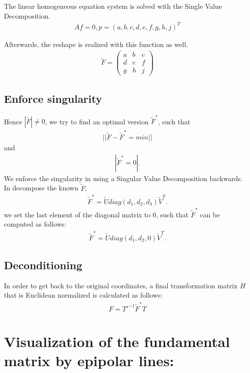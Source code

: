 \documentclass[a4paper,headings=small]{scrartcl}
\numberwithin{equation}{section} %
\numberwithin{figure}{section}   %
\begin{document}
  The linear homogeneous equation system is solved with the Single Value Decomposition.
  \begin{align}
  Af=0, p=(a,b,c,d,e,f,g,h,j)^T 
  \end{align}

  Afterwards, the reshape is realized with this function as well.
  \begin{align}
  \tilde{F}=
  \left( \begin{array}{cccc}
  a & b & c \\
  d & e & f \\ 
  g & h & j
  \end{array} \right)
  \end{align}

  \subsection{Enforce singularity}
Hence $|\tilde{F}|\neq 0$, we try  to find an optimal version $\tilde{F}^*$, such that
  \begin{align}
  ||\tilde{F}-\tilde{F}^*=min||
  \end{align}
and
  \begin{align}
  |\tilde{F}^*=0|.
  \end{align}
We enforce the singularity in using a Singular Value Decomposition backwards.
In decompose the known $\tilde{F}$,
  \begin{align}
  \tilde{F}^*=\tilde{U} diag(d_1,d_2,d_3)\tilde{V}^T.
  \end{align}  
we set the last element of the diagonal matrix to 0, such that $\tilde{F}^*$ can be computed
as follows:
  \begin{align}
  \tilde{F}^*=\tilde{U} diag(d_1,d_2,0)\tilde{V}^T.
  \end{align}
  \subsection{Deconditioning}
In order to get back to the original coordinates, a final transformation matrix $H$ 
that is Euclidean normalized is calculated as follows:
\begin{align}
F=T'^{-1}\tilde{F}^{*}T
\end{align}

\section{Visualization of the fundamental matrix by epipolar lines:}
\end{document}
